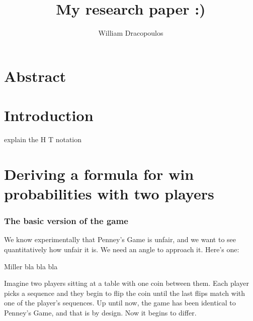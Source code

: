 \documentclass[english,12pt,a4paper,final]{article}
\title{My research paper :)}
\author{William Dracopoulos}
\begin{document}
	
\maketitle
\newpage

\tableofcontents
\newpage

\part{Abstract}

\part{Introduction}
explain the H T notation

\part{Deriving a formula for win probabilities with two players}

\section{The basic version of the game}

We know experimentally that Penney's Game is unfair, and we want to see quantitatively how unfair it is. We need an angle to approach it. Here's one:

Miller bla bla bla

Imagine two players sitting at a table with one coin between them. Each player picks a sequence and they begin to flip the coin until the last flips match with one of the player's sequences. Up until now, the game has been identical to Penney's Game, and that is by design. Now it begins to differ.
\end{document}
